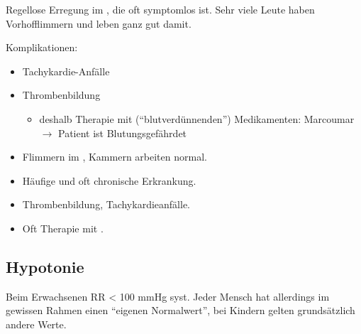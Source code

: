 {

Regellose Erregung im , die oft symptomlos ist. 
Sehr viele Leute haben Vorhofflimmern und leben ganz gut damit.

Komplikationen:
\begin{itemize}
  \item Tachykardie-Anfälle
  \item Thrombenbildung
  \begin{itemize}
    \item deshalb Therapie mit 
    ("`blutverdünnenden"') Medikamenten:
    Marcoumar ${\rightarrow}$ Patient ist Blutungsgefährdet
  \end{itemize}
\end{itemize}
}
{
\begin{itemize}
  \item Flimmern im , Kammern arbeiten normal.
  \item Häufige und oft chronische Erkrankung.
  \item Thrombenbildung, Tachykardieanfälle.
  \item Oft Therapie mit .
\end{itemize}

}{}{}{}


\subsection{Hypotonie}

 
 Beim Erwachsenen RR {\textless} 100 mmHg
syst. Jeder Mensch hat allerdings im gewissen Rahmen einen
"`eigenen Normalwert"', bei Kindern gelten grundsätzlich
andere Werte.

% 
% 
% 
% 



